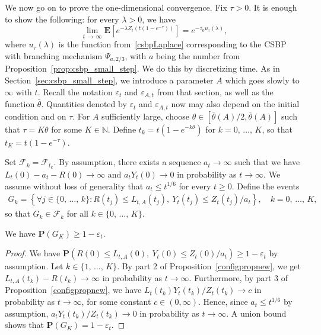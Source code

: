 \documentclass[AHL,Unicode,longabstracts,published]{cedram}
\newcommand*\eps{\varepsilon}
\newcommand*\E{\mathbf{E}}
\renewcommand*\P{\mathbf{P}}
\newcommand\F{\mathcal{F}}
\newcommand*\N{\mathbb{N}}
\newcommand{\1} {\mathds{1}}
\renewcommand*\to{\rightarrow}
\let\oldforall\forall
\renewcommand*{\forall}{\mathrel{\oldforall}}
\begin{document}
We now go on to prove the one-dimensional convergence. Fix $\tau > 0$. It is enough to show the following: for every $\lambda > 0$, we have
\begin{equation}\label{eq:750}
\lim_{t\,\to\,\infty} \E\left[e^{-\lambda Z_t\left(t\left(1-e^{-\tau}\right)\right)}\right] = e^{-z_0u_\tau(\lambda)},
\end{equation}
where $u_\tau(\lambda)$ is the function from~\eqref{csbpLaplace} corresponding to the CSBP with branching mechanism $\Psi_{a,2/3}$, with $a$ being the number from Proposition~\ref{prop:csbp_small_step}. We do this by discretizing time. As in Section~\ref{sec:csbp_small_step}, we introduce a parameter $A$ which goes slowly to $\infty$ with $t$. Recall the notation $\eps_t$ and $\eps_{A,t}$ from that section, as well as the function $\bar\theta$. Quantities denoted by $\eps_t$ and $\eps_{A,t}$ now may also depend on the initial condition and on $\tau$. For $A$ sufficiently large, choose $\theta\in [\bar{\theta}(A)/2,\bar{\theta}(A)]$ such that $\tau = K\theta$ for some $K\in\N$. Define $t_k = t(1-e^{-k\theta})$ for $k=0,\,\ldots,\,K$, so that $t_K = t(1-e^{-\tau})$.

Set $\F_k = \F_{t_k}$. By assumption, there exists a sequence $a_t\to \infty$ such that we have $L_t(0)-a_t-R(0) \to\infty$ and $a_tY_t(0)\to 0$ in probability as $t\to\infty$. We assume without loss of generality that $a_t \le t^{1/6}$ for every $t\ge0$. Define the events
\begin{align*}
G_k = \left\{\forall j\in\{0,\,\ldots,\,k\}: R(t_j) \le L_{t,A}(t_j),\ Y_t(t_j) \le Z_t(t_j)/a_t\right\},\quad k=0,\,\ldots,\,K,
\end{align*}
so that $G_k\in \F_k$ for all $k\in\{0,\,\ldots,\,K\}$.
\begin{lemm}\label{lem:Gk}
We have
\(
\P(G_K) \ge 1-\eps_t.
\)
\end{lemm}

\begin{proof}
We have $\P(R(0) \le L_{t,A}(0),\ Y_t(0) \le Z_t(0)/a_t)\ge 1-\eps_t$ by assumption. Let $k\in\{1,\,\ldots,\,K\}$. By part 2 of Proposition~\ref{configpropnew}, we get $L_{t,A}(t_k) - R(t_k) \to \infty$ in probability as $t\to\infty$. Furthermore, by part 3 of Proposition~\ref{configpropnew}, we have $L_t(t_k)Y_t(t_k)/Z_t(t_k)\to c$ in probability as $t\to\infty$, for some constant $c\in(0,\infty)$. Hence, since $a_t \le t^{1/6}$ by assumption, $a_t Y_t(t_k)/Z_t(t_k)\to 0$ in probability as $t\to\infty$. A union bound shows that $\P(G_K) = 1-\eps_t$.
\end{proof}
\end{document}
